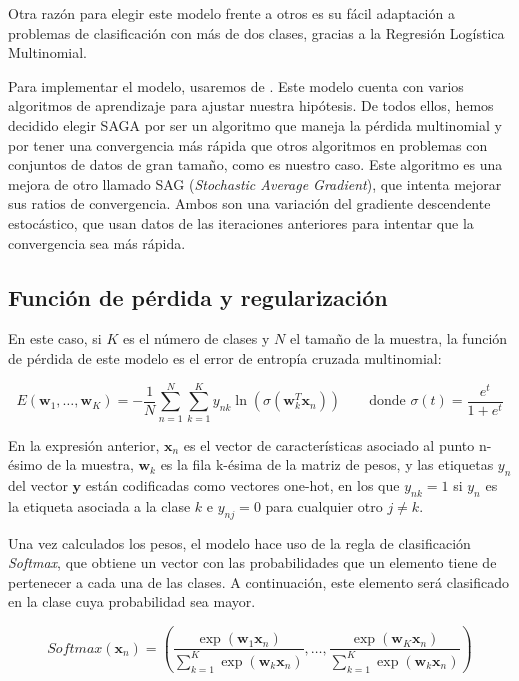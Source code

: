\documentclass[a4]{article}
\begin{document}
Otra razón para elegir este modelo frente a otros es su fácil adaptación a problemas de clasificación con más de dos clases, gracias a la Regresión Logística Multinomial.

Para implementar el modelo, usaremos  de . Este modelo cuenta con varios algoritmos de aprendizaje para ajustar nuestra hipótesis. De todos ellos, hemos decidido elegir SAGA por ser un algoritmo que maneja la pérdida multinomial y por tener una convergencia más rápida que otros algoritmos en problemas con conjuntos de datos de gran tamaño, como es nuestro caso. Este algoritmo es una mejora de otro llamado SAG (\textit{Stochastic Average Gradient}), que intenta mejorar sus ratios de convergencia. Ambos son una variación del gradiente descendente estocástico, que usan datos
de las iteraciones anteriores para intentar que la convergencia sea más rápida.



\subsection{Función de pérdida y regularización}

En este caso, si $K$ es el número de clases y $N$ el tamaño de la muestra, la función de pérdida de este modelo es el error de entropía cruzada multinomial:

$$E(\textbf{w}_1,\dots,\textbf{w}_{K}) = -\frac{1}{N}\sum_{n=1}^{N} \sum_{k=1}^{K} y_{nk} \ln(\sigma(\textbf{w}_k^T \textbf{x}_n)) \qquad \text{donde } \sigma(t)=\frac{e^t}{1+e^t}$$

En la expresión anterior, $\textbf{x}_n$ es el vector de características asociado al punto n-ésimo de la muestra, $\textbf{w}_k$ es la fila k-ésima de la matriz de pesos, y 
las etiquetas $y_n$ del vector $\textbf{y}$ están codificadas como vectores one-hot, en los que $y_{nk} = 1$ si $y_n$ es la etiqueta asociada a la clase $k$ e $y_{nj} = 0$ para cualquier otro $j \neq k$.

Una vez calculados los pesos, el modelo hace uso de la regla de clasificación \textit{Softmax}, que obtiene un vector con las probabilidades que un elemento tiene de pertenecer a cada una de las clases. A continuación, este elemento será clasificado en la clase cuya probabilidad sea mayor.

$$Softmax(\textbf{x}_n) = \left(\frac{\exp(\textbf{w}_1 \textbf{x}_n)}{\sum_{k=1}^{K}\exp(\textbf{w}_k \textbf{x}_n)},\dots,\frac{\exp(\textbf{w}_{K} \textbf{x}_n)}{\sum_{k=1}^{K}\exp(\textbf{w}_k \textbf{x}_n)}\right)$$
\end{document}
